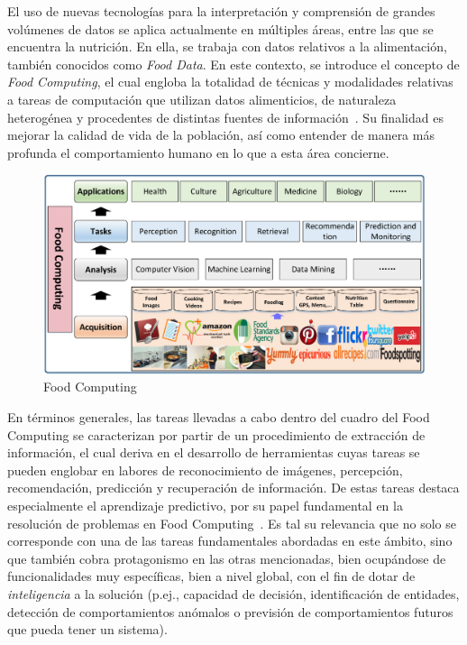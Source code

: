 El uso de nuevas tecnologías para la interpretación y comprensión de grandes volúmenes de datos se aplica actualmente en múltiples áreas, entre las que se encuentra la nutrición. En ella, se trabaja con datos relativos a la alimentación, también conocidos como \textit{Food Data}.
En este contexto, se introduce el concepto de \textit{Food Computing}, el cual engloba la totalidad de técnicas y modalidades relativas a tareas de computación que utilizan datos alimenticios, de naturaleza heterogénea y procedentes de distintas fuentes de información~\cite{min2019survey}. Su finalidad es mejorar la calidad de vida de la población, así como entender de manera más profunda el comportamiento humano en lo que a esta área concierne. 

\begin{figure}[H]
    \centering
    \includegraphics[width=1.0\textwidth]{imagenes/food_computing_1.png}
    \caption{Food Computing}
    \label{fig:food_computing_1}
\end{figure}

En términos generales, las tareas llevadas a cabo dentro del cuadro del Food Computing se caracterizan por partir de un procedimiento de extracción de información, el cual deriva en el desarrollo de herramientas cuyas tareas se pueden englobar en labores de reconocimiento de imágenes, percepción, recomendación, predicción y recuperación de información. De estas tareas destaca especialmente el aprendizaje predictivo, por su papel fundamental en la resolución de problemas en Food Computing~\cite{min2019survey}. Es tal su relevancia que no solo se corresponde con una de las tareas fundamentales abordadas en este ámbito, sino que también cobra protagonismo en las otras mencionadas, bien ocupándose de funcionalidades muy específicas, bien a nivel global, con el fin de dotar de \textit{inteligencia} a la solución (p.ej., capacidad de decisión, identificación de entidades, detección de comportamientos anómalos o previsión de comportamientos futuros que pueda tener un sistema). 

